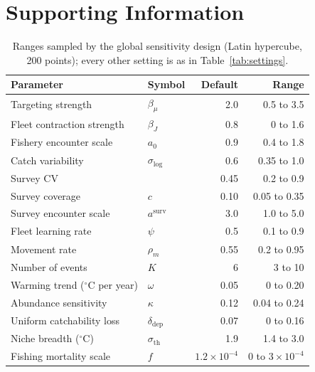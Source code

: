 \documentclass[11pt,a4paper]{article}
\newcommand{\vt}[1]{\text{#1}}
\begin{document}
\clearpage
\appendix
\section*{Supporting Information}
\setcounter{table}{0}
\setcounter{figure}{0}

\begin{table}[htbp]
\centering\footnotesize
\caption{Ranges sampled by the global sensitivity design (Latin hypercube, 200 points); every other setting is as in Table~\ref{tab:settings}.}
\label{tab:sensranges}
\begin{tabular}{@{}llrr@{}}
\toprule
Parameter & Symbol & Default & Range \\
\midrule
Targeting strength & $\beta_\mu$ & 2.0 & 0.5 to 3.5 \\
Fleet contraction strength & $\beta_J$ & 0.8 & 0 to 1.6 \\
Fishery encounter scale & $a_0$ & 0.9 & 0.4 to 1.8 \\
Catch variability & $\sigma_{\log}$ & 0.6 & 0.35 to 1.0 \\
Survey CV & & 0.45 & 0.2 to 0.9 \\
Survey coverage & $c$ & 0.10 & 0.05 to 0.35 \\
Survey encounter scale & $a^{\vt{surv}}$ & 3.0 & 1.0 to 5.0 \\
Fleet learning rate & $\psi$ & 0.5 & 0.1 to 0.9 \\
Movement rate & $\rho_m$ & 0.55 & 0.2 to 0.95 \\
Number of events & $K$ & 6 & 3 to 10 \\
Warming trend ($^\circ$C per year) & $\omega$ & 0.05 & 0 to 0.20 \\
Abundance sensitivity & $\kappa$ & 0.12 & 0.04 to 0.24 \\
Uniform catchability loss & $\delta_{\vt{dep}}$ & 0.07 & 0 to 0.16 \\
Niche breadth ($^\circ$C) & $\sigma_{\vt{th}}$ & 1.9 & 1.4 to 3.0 \\
Fishing mortality scale & $f$ & $1.2\times10^{-4}$ & 0 to $3\times10^{-4}$ \\
\bottomrule
\end{tabular}
\end{table}
\end{document}
